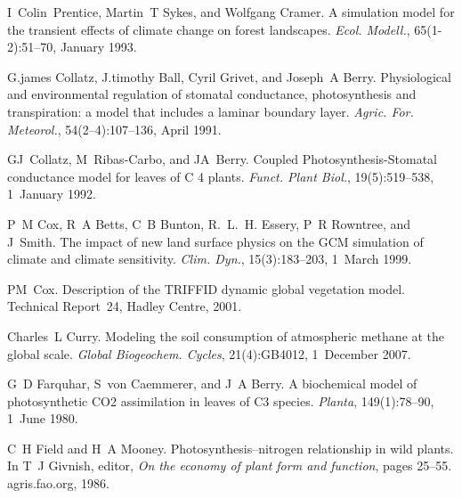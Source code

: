 \begin{DoxyDescription}
\item[\label{_CITEREF_Prentice1993-xn}%
\mbox{[}16\mbox{]}]I~Colin~Prentice, Martin~T Sykes, and Wolfgang Cramer. A simulation model for the transient effects of climate change on forest landscapes. {\itshape Ecol. Modell.}, 65(1-\/2)\+:51--70, January 1993. 


\item[\label{_CITEREF_Collatz1991-5bc}%
\mbox{[}17\mbox{]}]G.\+james Collatz, J.\+timothy Ball, Cyril Grivet, and Joseph~A Berry. Physiological and environmental regulation of stomatal conductance, photosynthesis and transpiration\+: a model that includes a laminar boundary layer. {\itshape Agric. For. Meteorol.}, 54(2–4)\+:107--136, April 1991. 


\item[\label{_CITEREF_Collatz1992-jf}%
\mbox{[}18\mbox{]}]G\+J~Collatz, M~Ribas-\/\+Carbo, and J\+A~Berry. Coupled Photosynthesis-\/\+Stomatal conductance model for leaves of C 4 plants. {\itshape Funct. Plant Biol.}, 19(5)\+:519--538, 1~January 1992. 


\item[\label{_CITEREF_Cox1999-ia}%
\mbox{[}19\mbox{]}]P~M Cox, R~A Betts, C~B Bunton, R.~L.~H. Essery, P~R Rowntree, and J~Smith. The impact of new land surface physics on the G\+C\+M simulation of climate and climate sensitivity. {\itshape Clim. Dyn.}, 15(3)\+:183--203, 1~March 1999. 


\item[\label{_CITEREF_Cox2001-am}%
\mbox{[}20\mbox{]}]P\+M~Cox. Description of the T\+R\+I\+F\+F\+I\+D dynamic global vegetation model. Technical Report~24, Hadley Centre, 2001.


\item[\label{_CITEREF_Curry2007-du}%
\mbox{[}21\mbox{]}]Charles~L Curry. Modeling the soil consumption of atmospheric methane at the global scale. {\itshape Global Biogeochem. Cycles}, 21(4)\+:G\+B4012, 1~December 2007. 


\item[\label{_CITEREF_Farquhar1980-96e}%
\mbox{[}22\mbox{]}]G~D Farquhar, S~von Caemmerer, and J~A Berry. A biochemical model of photosynthetic C\+O2 assimilation in leaves of C3 species. {\itshape Planta}, 149(1)\+:78--90, 1~June 1980. 


\item[\label{_CITEREF_Field1986-kd}%
\mbox{[}23\mbox{]}]C~H Field and H~A Mooney. Photosynthesis--nitrogen relationship in wild plants. In T~J Givnish, editor, {\itshape On the economy of plant form and function}, pages 25--55. agris.\+fao.\+org, 1986.



\end{DoxyDescription}
